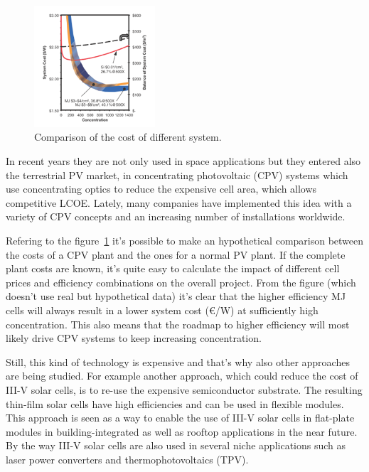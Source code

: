 \documentclass[11pt]{article} %
\begin{document}
\begin{figure}
	\centering
	\includegraphics[width=0.4\textwidth]{img/sadasd.png}
	\caption{Comparison of the cost of different system.\label{fig:aa}}
	\vspace{-130pt}
\end{figure}



 In recent years they are not  only used in space applications but they entered also the terrestrial PV market, in  concentrating  photovoltaic  (CPV)  systems which use  concentrating  optics  to  reduce  the  expensive  cell  area,  which  allows  competitive  LCOE.  Lately, many  companies  have  implemented  this  idea  with  a  variety  of  CPV  concepts  and  an  increasing number of installations worldwide.   

 
Refering to the figure~\ref{fig:aa} it’s possible to make an hypothetical comparison between the costs of a CPV plant and the ones for a normal PV plant. If the complete plant costs are known, it’s quite easy to calculate the impact of different cell prices and efficiency combinations on the overall project. From the figure (which doesn’t use real but hypothetical data) it’s clear that the higher efficiency MJ cells will always result in a lower system cost (€/W) at sufficiently high concentration. This also means that the roadmap to higher efficiency will most likely drive CPV systems to keep increasing concentration.   

Still, this kind of technology is expensive and that’s why also other approaches are being studied. For example another  approach, which  could  reduce  the cost  of  III-V  solar  cells,  is  to re-use  the  expensive semiconductor substrate. The resulting thin-film solar cells have high efficiencies and can be used in flexible modules. This approach is  seen  as  a  way  to  enable  the  use  of  III-V  solar  cells  in  flat-plate modules in building-integrated as well as rooftop applications in the near future. By the way III-V solar cells are also used in several niche applications such as laser power converters and thermophotovoltaics (TPV).
 
\end{document}
